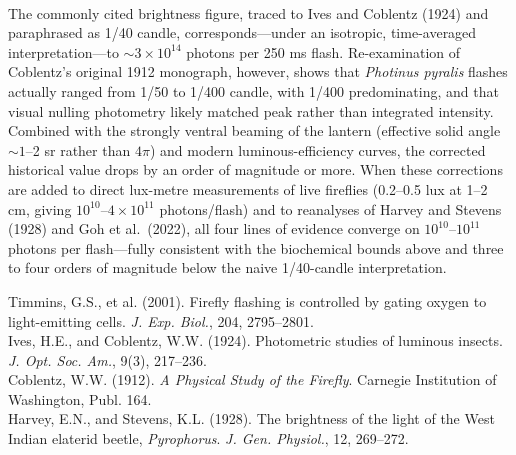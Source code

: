 \begin{technical}
\\
The commonly cited brightness figure, traced to Ives and Coblentz (1924) and paraphrased as \QSOpen{}1/40 candle,\QSClose{} corresponds—under an isotropic, time-averaged interpretation—to $\sim 3 \times 10^{14}$ photons per 250 ms flash. Re-examination of Coblentz's original 1912 monograph, however, shows that \textit{Photinus pyralis} flashes actually ranged from 1/50 to 1/400 candle, with 1/400 predominating, and that visual nulling photometry likely matched peak rather than integrated intensity. Combined with the strongly ventral beaming of the lantern (effective solid angle $\sim 1$–2 sr rather than $4\pi$) and modern luminous-efficiency curves, the corrected historical value drops by an order of magnitude or more. When these corrections are added to direct lux-metre measurements of live fireflies (0.2–0.5 lux at 1–2 cm, giving $10^{10}$–$4 \times 10^{11}$ photons/flash) and to reanalyses of Harvey and Stevens (1928) and Goh et al.\ (2022), all four lines of evidence converge on $10^{10}$–$10^{11}$ photons per flash—fully consistent with the biochemical bounds above and three to four orders of magnitude below the naive 1/40-candle interpretation.

\techref
{\footnotesize
Timmins, G.S., et al. (2001). Firefly flashing is controlled by gating oxygen to light-emitting cells. \textit{J. Exp. Biol.}, 204, 2795–2801.\\
Ives, H.E., and Coblentz, W.W. (1924). Photometric studies of luminous insects. \textit{J. Opt. Soc. Am.}, 9(3), 217–236.\\
Coblentz, W.W. (1912). \textit{A Physical Study of the Firefly}. Carnegie Institution of Washington, Publ. 164.\\
Harvey, E.N., and Stevens, K.L. (1928). The brightness of the light of the West Indian elaterid beetle, \textit{Pyrophorus}. \textit{J. Gen. Physiol.}, 12, 269–272.\\
}
\end{technical}